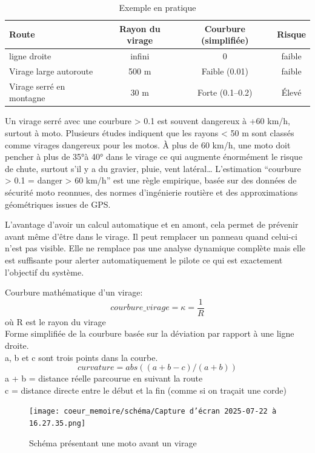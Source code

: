 \begin{table}[ht]
\centering
\begin{tabular}{|l|c|c|c|}
\hline
Route & Rayon du virage & Courbure (simplifiée) & Risque \\
\hline
ligne droite & infini & 0 & faible \\
Virage large autoroute & 500 m & Faible (0.01) & faible \\
Virage serré en montagne & 30 m & Forte (0.1–0.2) & Élevé \\
\hline
\end{tabular}
\caption{Exemple en pratique}
\end{table}

Un virage serré avec une courbure > 0.1 est souvent dangereux à +60 km/h, surtout à moto.
Plusieurs études indiquent que les rayons < 50 m sont classés comme virages dangereux pour les motos. À plus de 60 km/h, une moto doit pencher à plus de 35°à 40° dans le virage ce qui augmente énormément le risque de chute, surtout s’il y a du gravier, pluie, vent latéral…
L’estimation “courbure > 0.1 = danger > 60 km/h” est une règle empirique, basée sur des données de sécurité moto reonnues, des normes d'ingénierie routière et des approximations géométriques issues de GPS.


L'avantage d'avoir un calcul automatique et en amont, cela permet de prévenir avant même d'être dans le virage. Il peut remplacer un panneau quand celui-ci n'est pas visible. Elle ne remplace pas une analyse dynamique complète mais elle est suffisante pour alerter automatiquement le pilote ce qui est exactement l’objectif du système.



\begin{tcolorbox}[title=Calcul de la courbure]
Courbure mathématique\cite{formule_curvature} d’un virage:
\[
courbure\_virage = \kappa = \frac{1}{R}
\]
où R est le rayon du virage\\
Forme simplifiée de la courbure basée sur la déviation par rapport à une ligne droite.\\
a, b et c sont trois points dans la courbe.\\
\[
curvature = abs((a + b - c) / (a + b))
\]
a + b = distance réelle parcourue en suivant la route \\
c = distance directe entre le début et la fin (comme si on traçait une corde)
\end{tcolorbox}

\begin{figure}[H]
    \centering
    \texttt{[image: coeur\_memoire/schéma/Capture d’écran 2025-07-22 à 16.27.35.png]} 
    \caption{Schéma présentant une moto avant un virage}
\end{figure}


